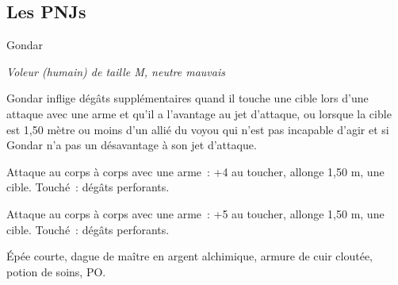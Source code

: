 \documentclass[a4paper,10pt,openany]{book}
\begin{document}
\begin{multicols}{2}
\pagebreak
\section{Les PNJs}

\begin{monsterbox}{Gondar}
	\begin{hangingpar}
		\textit{Voleur (humain) de taille M, neutre mauvais}
	\end{hangingpar}
	\dndline%
	\basics[%
	armorclass = 14 (armure de cuir cloutée),
	hitpoints  = \dice{4d8 + 4},
	speed      = 9 m
	]
	\dndline%
	\stats[
	STR = \stat{10},
	DEX = \stat{14},
	CON = \stat{12},
	INT = \stat{13},
	WIS = \stat{12}
	]
	\dndline%
	\details[%
	skills={Athlétisme +2, Discrétion +4, Perception +3, Tromperie +2},
	senses= Perception passive 13,
	languages = {bas-thrain, vethrain, sethrain},
	challenge= 1/2
	]
	\dndline%
	\begin{monsteraction}
		Gondar inflige  dégâts supplémentaires quand il touche une cible lors d’une attaque avec une arme et qu’il a l’avantage au jet
		d’attaque, ou lorsque la cible est 1,50 mètre ou moins d’un allié du voyou qui n’est pas incapable d’agir et si Gondar n’a pas un désavantage à son
		jet d’attaque.
	\end{monsteraction}
	\begin{monsteraction}
		Attaque au corps à corps avec une arme : +4 au toucher, allonge 1,50 m, une cible. Touché :  dégâts perforants.
	\end{monsteraction}
	\begin{monsteraction}[Dague]
		Attaque au corps à corps avec une arme : +5 au toucher, allonge 1,50 m, une cible. Touché :  dégâts perforants.
	\end{monsteraction}
	\dndline%
	\begin{monsteraction}[Possessions]
		Épée courte, dague de maître en argent alchimique, armure de cuir cloutée, potion de soins,  PO.
	\end{monsteraction}
\end{monsterbox}


\end{multicols}
\end{document}
